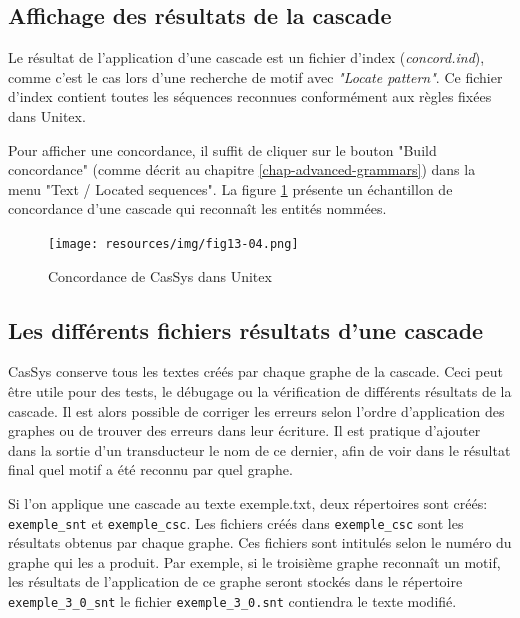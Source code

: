 \subsection{Affichage des résultats de la cascade}
\label{subsec:resultsCascade}

Le résultat de l'application d'une cascade est un fichier d'index (\textit{concord.ind}), comme c'est le cas
lors d'une recherche de motif avec \textit{"Locate pattern"}. Ce fichier d'index contient toutes les séquences
reconnues conformément aux règles fixées dans Unitex.

\bigskip
\noindent Pour afficher une concordance, il suffit de cliquer sur le bouton "Build concordance"
(comme décrit au chapitre \ref{chap-advanced-grammars}) dans la menu "Text / Located sequences".
La figure \ref{fig13-04} présente un échantillon de concordance d'une cascade qui reconnaît les entités
nommées.


\begin{figure}[!htb]
  \centering
  \texttt{[image: resources/img/fig13-04.png]}
  \caption{Concordance de CasSys dans Unitex}
  \label{fig13-04}
\end{figure}

\subsection{Les différents fichiers résultats d'une cascade}

CasSys conserve tous les textes créés par chaque graphe  de la cascade. Ceci peut être
utile  pour des tests, le débugage ou la vérification de différents résultats de la cascade. Il est
alors possible de corriger les erreurs selon l'ordre d'application des graphes ou de trouver des
erreurs dans leur écriture. Il est pratique d'ajouter dans la sortie d'un transducteur le nom de ce
dernier, afin de voir dans le résultat final quel motif a été reconnu par quel graphe.

Si l'on applique une cascade au texte exemple.txt, deux répertoires sont créés:
\verb+exemple_snt+ et \verb+exemple_csc+.
Les fichiers créés dans \verb+exemple_csc+ sont les résultats obtenus par
chaque graphe. Ces fichiers sont intitulés selon le numéro du graphe qui les a produit. Par exemple, si le
troisième graphe reconnaît un motif, les résultats de l'application de ce graphe seront stockés dans le 
répertoire  \verb+exemple_3+\newline\verb+_0_snt+ le fichier \verb+exemple_3_0.snt+ contiendra le texte modifié.

